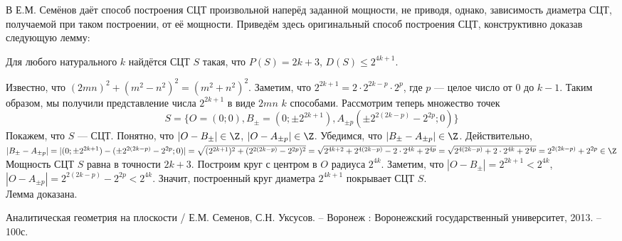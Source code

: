 В \cite{angem1kurs} Е.М. Семёнов даёт способ построения СЦТ произвольной наперёд заданной мощности, не приводя, однако, зависимость диаметра СЦТ, получаемой при таком построении, от её мощности.
Приведём здесь оригинальный способ построения СЦТ, конструктивно доказав следующую лемму:

\begin{lemma}
	Для любого натурального $k$ найдётся СЦТ $S$ такая, что $P(S)=2k+3$, $D(S)\leq 2^{4k+1}$.
\end{lemma}

\dokvo
	Известно, что $(2mn)^2+(m^2-n^2)^2=(m^2+n^2)^2$.
	Заметим, что $2^{2k+1} = 2 \cdot 2^{2k-p} \cdot 2^p$, где $p$ --- целое число от $0$ до $k-1$.
	Таким образом, мы получили представление числа $2^{2k+1}$ в виде $2mn$ $k$ способами.
	Рассмотрим теперь множество точек
	$$
		S=\{O=(0;0),B_\pm=(0;\pm 2^{2k+1}),A_{\pm p}(\pm 2^{2(2k-p)}-2^{2p};0)\}
	$$
	Покажем, что $S$ --- СЦТ.
	Понятно, что $|O-B_\pm|\in\Z$, $|O-A_{\pm p}|\in\Z$.
	Убедимся, что $|B_\pm-A_{\pm p}|\in\Z$.
	Действительно, $|B_\pm-A_{\pm p}|=|(0;\pm 2^{2k+1}) - (\pm 2^{2(2k-p)}-2^{2p};0)| = \sqrt{(2^{2k+1})^2+(2^{2(2k-p)}-2^{2p})^2}=
	\sqrt{2^{4k+2}+2^{4(2k-p)}-2\cdot 2^{4k}+2^{4p}}=\sqrt{2^{4(2k-p)}+2\cdot 2^{4k}+2^{4p}}=2^{2(2k-p)}+2^{2p}\in\Z$
	Мощность СЦТ $S$ равна в точности $2k+3$.
	Построим круг с центром в $O$ радиуса $2^{4k}$.
	Заметим, что $|O-B_\pm|=2^{2k+1}<2^{4k}$, $|O-A_{\pm p}| = 2^{2(2k-p)}-2^{2p} < 2^{4k}$.
	Значит, построенный круг диаметра $2^{4k+1}$ покрывает СЦТ $S$.
\\ Лемма доказана.


\begin{thebibliography}{99}

 Аналитическая геометрия на плоскости / Е.М. Семенов, С.Н. Уксусов. – Воронеж : Воронежский государственный университет, 2013. – 100с.

\end{thebibliography}
